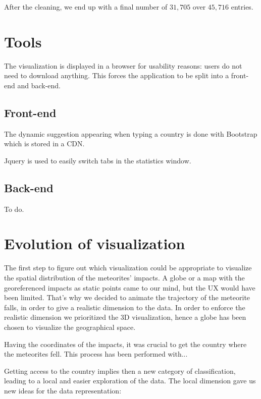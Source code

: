 \documentclass[10pt,conference,compsocconf]{IEEEtran}
\begin{document}
After the cleaning, we end up with a final number of $31,705$ over $45,716$ entries.

\section{Tools}
\label{sec:tools}

The visualization is displayed in a browser for usability reasons: users do not need to download anything. This forces the application to be split into a front-end and back-end.

\subsection{Front-end}

The dynamic suggestion appearing when typing a country is done with Bootstrap which is stored in a CDN.

Jquery is used to easily switch tabs in the statistics window.


\subsection{Back-end}

To do.

\section{Evolution of visualization}
\label{sec:evolution_of_visualization}

The first step to figure out which visualization could be appropriate to visualize the spatial distribution of the meteorites' impacts. A globe or a map with the georeferenced impacts as static points came to our mind, but the UX would have been limited. That's why we decided to animate the trajectory of the meteorite falls, in order to give a realistic dimension to the data. In order to enforce the realistic dimension we prioritized the 3D visualization, hence a globe has been chosen to visualize the geographical space. 

Having the coordinates of the impacts, it was crucial to get the country where the meteorites fell. This process has been performed with... %

Getting access to the country implies then a new category of classification, leading to a local and easier exploration of the data. The local dimension gave us new ideas for the data representation: 
\end{document}
